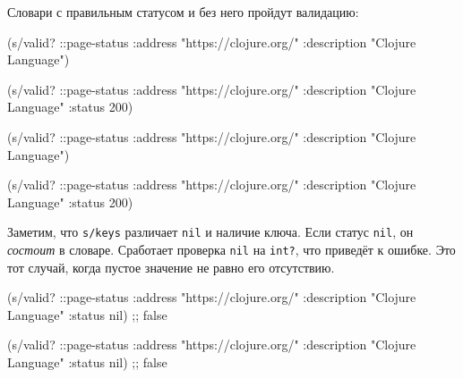 Словари с правильным статусом и без него пройдут валидацию:

\ifx\DEVICETYPE\MOBILE

\begin{english}
  \begin{clojure}
(s/valid? ::page-status
  {:address "https://clojure.org/"
   :description "Clojure Language"})

(s/valid? ::page-status
  {:address "https://clojure.org/"
   :description "Clojure Language"
   :status 200})
  \end{clojure}
\end{english}

\else

\begin{english}
  \begin{clojure}
(s/valid? ::page-status
          {:address "https://clojure.org/"
           :description "Clojure Language"})

(s/valid? ::page-status
          {:address "https://clojure.org/"
           :description "Clojure Language"
           :status 200})
  \end{clojure}
\end{english}

\fi


Заметим, что \verb|s/keys| различает \verb|nil| и наличие ключа. Если статус
\verb|nil|, он \emph{состоит} в словаре. Сработает проверка \verb|nil| на
\verb|int?|, что приведёт к ошибке. Это тот случай, когда пустое значение
не равно его отсутствию.

\ifx\DEVICETYPE\MOBILE

\begin{english}
  \begin{clojure}
(s/valid? ::page-status
  {:address "https://clojure.org/"
   :description "Clojure Language"
   :status nil})
;; false
  \end{clojure}
\end{english}

\else

\begin{english}
  \begin{clojure}
(s/valid? ::page-status
          {:address "https://clojure.org/"
           :description "Clojure Language"
           :status nil})
;; false
  \end{clojure}
\end{english}

\fi

